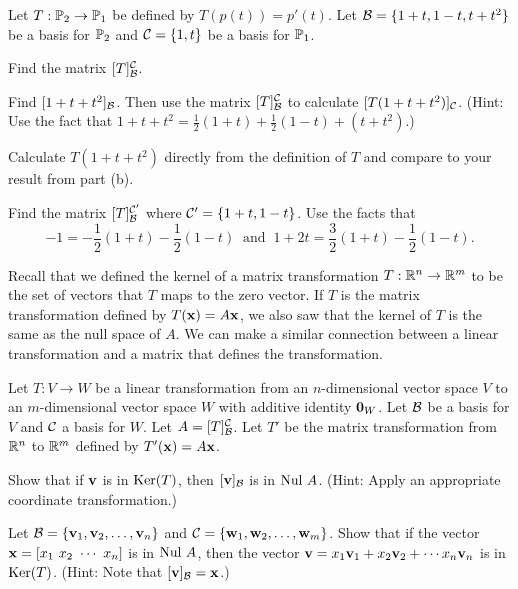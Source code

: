 \begin{activity} Let $T : \mathbb{P}_2 \to \mathbb{P}_1$ be defined by $T(p(t))= p'(t)$. Let $\mathcal{B} = \{1+t,1-t,t+t^2\}$ be a basis for $\mathbb{P}_2$ and $\mathcal{C} = \{1, t\}$ be a basis for $\mathbb{P}_1$. 
	\ba
	\item Find the matrix $[T]_{\mathcal{B}}^{\mathcal{C}}$.
	

	\item Find $[1+t+t^2]_{\mathcal{B}}$. Then use the matrix $[T]_{\mathcal{B}}^{\mathcal{C}}$ to calculate $[T(1+t+t^2)]_{\mathcal{C}}$. (Hint: Use the fact that $1+t+t^2 =\frac{1}{2}(1+t) + \frac{1}{2}(1-t) + (t+t^2)$.) 


	\item Calculate $T(1+t+t^2)$ directly from the definition of $T$ and compare to your result from part (b).

	\item Find the matrix $[T]_{\mathcal{B}}^{\mathcal{C}'}$ where $\mathcal{C}'=\{1+t, 1-t\}$. Use the facts that 
	\[-1 = -\frac{1}{2}(1+t) - \frac{1}{2}(1-t) \ \text{ and } \ 1+2t = \frac{3}{2}(1+t) - \frac{1}{2}(1-t).\]
	
	\ea 
\end{activity}


Recall that we defined the kernel of a matrix transformation $T: \mathbb{R}^n \to \mathbb{R}^m$ to be the set of vectors that $T$ maps to the zero vector. If $T$ is the matrix transformation defined by $T(\mathbf{x}) = A \mathbf{x}$, we also saw that the kernel of $T$ is the same as the null space of $A$. We can make a similar connection between a linear transformation and  a matrix that defines the transformation. 

\begin{activity} \label{act:8_b_kernel} Let $T : V \to W$ be a linear transformation from an $n$-dimensional vector space $V$ to an $m$-dimensional vector space $W$ with additive identity $\mathbf{0}_W$. Let $\mathcal{B}$ be a basis for $V$ and $\mathcal{C}$ a basis for $W$. Let $A = [T]_{\mathcal{B}}^{\mathcal{C}}$. Let $T'$ be the matrix transformation from $\mathbb{R}^n$ to $\mathbb{R}^m$ defined by $T'(\mathbf{x}) = A\mathbf{x}$. 
\ba
\item Show that if $\mathbf{v}$ is in $\text{Ker}(T)$, then $[\mathbf{v}]_{\mathcal{B}}$ is in $\text{Nul } A$. (Hint: Apply an appropriate coordinate transformation.) 


\item Let $\mathcal{B} = \{\mathbf{v}_1, \mathbf{v}_2, \ldots, \mathbf{v}_n\}$ and $\mathcal{C} = \{\mathbf{w}_1, \mathbf{w}_2, \ldots, \mathbf{w}_m\}$. Show that if the vector $\mathbf{x} = [x_1 \ x_2 \ \cdots \ x_n]$ is in $\text{Nul } A$, then the vector $\mathbf{v} = x_1\mathbf{v}_1 + x_2 \mathbf{v}_2 + \cdots x_n \mathbf{v}_n$ is in $\text{Ker}(T)$. (Hint: Note that $[\mathbf{v}]_{\mathcal{B}} = \mathbf{x}$.)

\ea

\end{activity}

